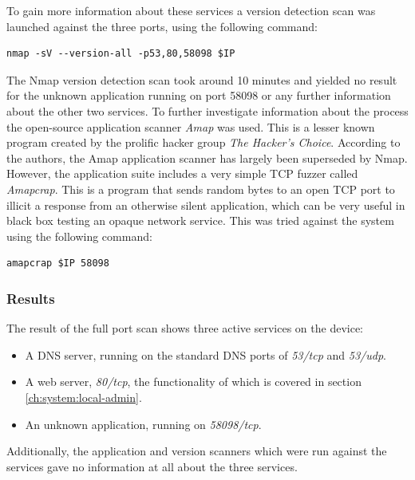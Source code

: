 To gain more information about these services a version detection scan was launched against the three ports, using the following command:
\begin{lstlisting}[frame=tb]
    nmap -sV --version-all -p53,80,58098 $IP
\end{lstlisting}
The Nmap version detection scan took around 10 minutes and yielded no result for the unknown application running on port 58098 or any further information about the other two services. To further investigate information about the process the open-source application scanner \textit{Amap} was used. This is a lesser known program created by the prolific hacker group \textit{The Hacker's Choice}. According to the authors, the Amap application scanner has largely been superseded by Nmap. However, the application suite includes a very simple TCP fuzzer called \textit{Amapcrap}. This is a program that sends random bytes to an open TCP port to illicit a response from an otherwise silent application, which can be very useful in black box testing an opaque network service. This was tried against the system using the following command:
\begin{lstlisting}[frame=tb]
    amapcrap $IP 58098
\end{lstlisting}

\subsubsection{Results}
The result of the full port scan shows three active services on the device:
\begin{itemize}
    \item A DNS server, running on the standard DNS ports of \textit{53/tcp} and \textit{53/udp}.
    \item A web server, \textit{80/tcp}, the functionality of which is covered in section \ref{ch:system:local-admin}.
    \item An unknown application, running on \textit{58098/tcp}.
\end{itemize}
Additionally, the application and version scanners which were run against the services gave no information at all about the three services.

